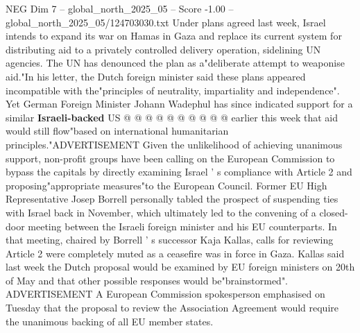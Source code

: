 \begin{textsample}{NEG Dim 7 – global\_north\_2025\_05 – Score -1.00 – global\_north\_2025\_05/124703030.txt}
Under plans agreed last week, Israel intends to expand its war on Hamas in Gaza and replace its current system for distributing aid to a privately controlled delivery operation, sidelining UN agencies.
The UN has denounced the plan as a"deliberate attempt to weaponise aid."In his letter, the Dutch foreign minister said these plans appeared incompatible with the"principles of neutrality, impartiality and independence".
Yet German Foreign Minister Johann Wadephul has since indicated support for a similar \textbf{Israeli-backed} US @ @ @ @ @ @ @ @ @ @ earlier this week that aid would still flow"based on international humanitarian principles."ADVERTISEMENT Given the unlikelihood of achieving unanimous support, non-profit groups have been calling on the European Commission to bypass the capitals by directly examining Israel ' s compliance with Article 2 and proposing"appropriate measures"to the European Council.
Former EU High Representative Josep Borrell personally tabled the prospect of suspending ties with Israel back in November, which ultimately led to the convening of a closed-door meeting between the Israeli foreign minister and his EU counterparts.
In that meeting, chaired by Borrell ' s successor Kaja Kallas, calls for reviewing Article 2 were completely muted as a ceasefire was in force in Gaza.
Kallas said last week the Dutch proposal would be examined by EU foreign ministers on 20th of May and that other possible responses would be"brainstormed".
ADVERTISEMENT A European Commission spokesperson emphasised on Tuesday that the proposal to review the Association Agreement would require the unanimous backing of all EU member states.

\end{textsample}
